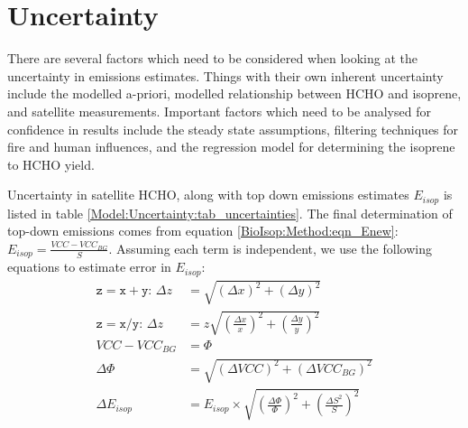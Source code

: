 \section{Uncertainty}
\label{BioIsop:Uncertainty}

  There are several factors which need to be considered when looking at the uncertainty in emissions estimates.
  Things with their own inherent uncertainty include the modelled a-priori, modelled relationship between HCHO and isoprene, and satellite measurements.
  Important factors which need to be analysed for confidence in results include the steady state assumptions, filtering techniques for fire and human influences, and the regression model for determining the isoprene to HCHO yield.
  
  Uncertainty in satellite HCHO, along with top down emissions estimates $E_{isop}$ is listed in table \ref{Model:Uncertainty:tab_uncertainties}.
  The final determination of top-down emissions comes from equation \ref{BioIsop:Method:eqn_Enew}: $E_{isop}=\frac{VCC - VCC_{BG}}{S}$.
  Assuming each term is independent, we use the following equations to estimate error in $E_{isop}$:
  \begin{align*}
    \mathtt{z=x+y:} \, \Delta{z} & = \sqrt{(\Delta{x})^2 + (\Delta{y})^2} \\
    \mathtt{z=x/y:} \, \Delta{z} & = z \sqrt{(\frac{\Delta{x}}{x})^2 + (\frac{\Delta{y}}{y})^2} \\
    VCC - VCC_{BG} & = \Phi \\
    \Delta{\Phi} & = \sqrt{(\Delta{VCC})^2 + (\Delta{VCC_{BG}})^2} \\
    \Delta{E_{isop}} &= E_{isop} \times \sqrt{(\frac{\Delta{\Phi}}{\Phi})^2 + (\frac{\Delta{S}^2}{S})^2}
  \end{align*}
